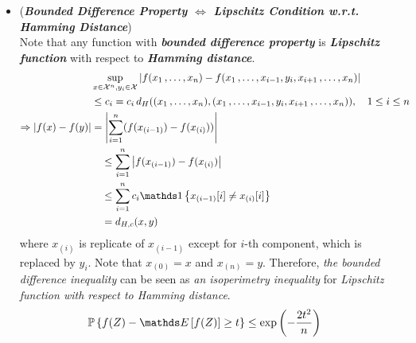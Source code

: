 \documentclass[11pt]{article}
\begin{document}
\begin{itemize}
\item \begin{example} (\textbf{\emph{Bounded Difference Property $\Leftrightarrow$ Lipschitz Condition w.r.t. Hamming Distance}}) \\
Note that any  function with \emph{\textbf{bounded difference property}} is \emph{\textbf{Lipschitz function}} with respect to \emph{\textbf{Hamming distance}}. 
\begin{align*}
&\sup_{x \in \cX^n, y_i \in \cX}\abs{f(x_1 \xdotx{,} x_n) - f(x_1 \xdotx{,} x_{i-1}, y_i, x_{i+1} \xdotx{,} x_{n})} &\\
&\le c_i = c_i\,d_{H}((x_1 \xdotx{,} x_n), (x_1 \xdotx{,} x_{i-1}, y_i, x_{i+1} \xdotx{,} x_{n})), \quad 1\le i \le n\\
\Rightarrow \abs{f(x) - f(y)} &=  \abs{\sum_{i=1}^{n}(f(x_{(i-1)}) - f(x_{(i)}) )}\\
&\quad \le  \sum_{i=1}^{n}\abs{f(x_{(i-1)}) - f(x_{(i)}) }\\
&\quad \le \sum_{i=1}^{n}c_i \ind{x_{(i-1)}[i] \neq x_{(i)}[i]} \\
&\quad = d_{H,c}(x, y)
\end{align*}   where $x_{(i)}$ is replicate of $x_{(i-1)}$ except for $i$-th component, which is replaced by $y_i$. Note that $x_{(0)} = x$ and $x_{(n)} = y$. 
Therefore, \emph{the bounded difference inequality} can be seen as \emph{an isoperimetry inequality} for \emph{Lipschitz function with respect to Hamming distance}.
\begin{align*}
 \bP\set{f(Z) - \E{}{f(Z)} \ge t } &\le \exp\paren{-\frac{2t^2}{n}}
\end{align*}
\end{example}


\end{itemize}
\end{document}

